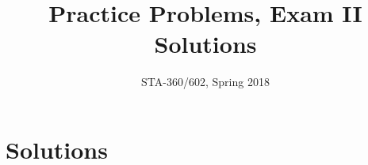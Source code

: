 \documentclass{article}
\begin{document}
\title{Practice Problems, Exam II Solutions}
\author{STA-360/602, Spring 2018}
\maketitle



\section{Solutions}
\end{document}
